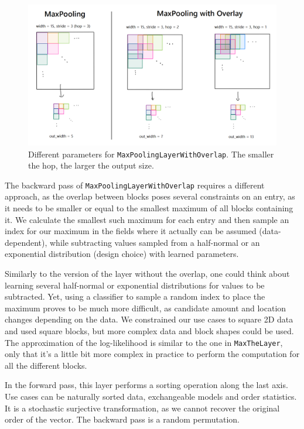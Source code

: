 \begin{figure}
    \centering
\includegraphics[width=\textwidth]{images/layers/BothMaxPoolings.png}
    \caption{Different parameters for \texttt{MaxPoolingLayerWithOverlap}. The smaller the hop, the larger the output size.}\label{fig:both_maxpoolings}
\end{figure}

The backward pass of \texttt{MaxPoolingLayerWithOverlap} requires a different approach, as the overlap between blocks poses several constraints on an entry, as it needs to be smaller or equal to the smallest maximum of all blocks containing it. We calculate the smallest such maximum for each entry and then sample an index for our maximum in the fields where it actually can be assumed (data-dependent), while subtracting values sampled from a half-normal or an exponential distribution (design choice) with learned parameters.

Similarly to the version of the layer without the overlap, one could think about learning several half-normal or exponential distributions for values to be subtracted. Yet, using a classifier to sample a random index to place the maximum proves to be much more difficult, as candidate amount and location changes depending on the data. We constrained our use cases to square 2D data and used square blocks, but more complex data and block shapes could be used. The approximation of the log-likelihood is similar to the one in \texttt{MaxTheLayer}, only that it's a little bit more complex in practice to perform the computation for all the different blocks.

\label{sec:sorting_layer}
In the forward pass, this layer performs a sorting operation along the last axis. Use cases can be naturally sorted data, exchangeable models and order statistics. It is a stochastic surjective transformation, as we cannot recover the original order of the vector. The backward pass is a random permutation.

